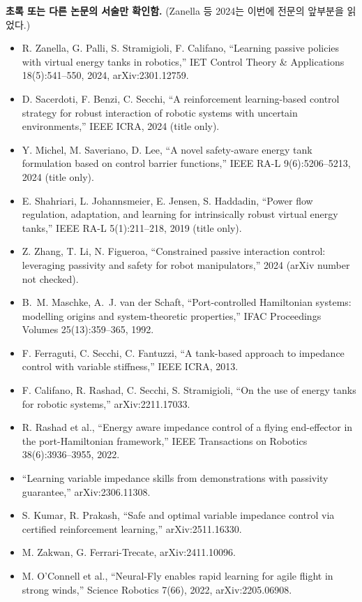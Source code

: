 \documentclass[11pt]{article}\usepackage[margin=1in]{geometry}\usepackage{amsmath,amssymb,amsthm,mathtools}\usepackage{graphicx}\graphicspath{{figures/}{../figures/}{figs/}{./}}\usepackage{enumitem}\usepackage{hyperref}\usepackage{cleveref}\usepackage{tikz}\usetikzlibrary{arrows.meta,positioning,calc,shapes.geometric}\usepackage{float}\usepackage{rotating}\usepackage[most]{tcolorbox}\usepackage{kotex}\usepackage{booktabs}\usepackage{longtable}\emergencystretch=1.6em\tolerance=2000 \crefname{assumption}{Assumption}{Assumptions}\Crefname{assumption}{Assumption}{Assumptions}\crefname{definition}{Definition}{Definitions}\Crefname{definition}{Definition}{Definitions}\crefname{proposition}{Proposition}{Propositions}\Crefname{proposition}{Proposition}{Propositions}\crefname{fact}{Fact}{Facts}\Crefname{fact}{Fact}{Facts} \newtheorem{assumption}{Assumption}\newtheorem{definition}{Definition}\newtheorem{lemma}{Lemma}\newtheorem{proposition}{Proposition}\newtheorem{theorem}{Theorem}\newtheorem{corollary}{Corollary}\newtheorem{fact}{Fact}\theoremstyle{remark}\newtheorem{remark}{Remark} \newcommand{\R}{\mathbb{R}}\newcommand{\xb}{\bar x}\newcommand{\Ab}{\bar A}\newcommand{\By}{\bar B_y}\newcommand{\U}{\mathcal U}\newcommand{\Z}{\mathcal Z}
\begin{document}
\textbf{초록 또는 다른 논문의 서술만 확인함.} (Zanella 등 2024는 이번에 전문의 앞부분을 읽었다.)
\begin{itemize}
\item R. Zanella, G. Palli, S. Stramigioli, F. Califano, ``Learning passive policies with virtual energy tanks in robotics,'' IET Control Theory \& Applications 18(5):541--550, 2024, arXiv:2301.12759.
\item D. Sacerdoti, F. Benzi, C. Secchi, ``A reinforcement learning-based control strategy for robust interaction of robotic systems with uncertain environments,'' IEEE ICRA, 2024 (title only).
\item Y. Michel, M. Saveriano, D. Lee, ``A novel safety-aware energy tank formulation based on control barrier functions,'' IEEE RA-L 9(6):5206--5213, 2024 (title only).
\item E. Shahriari, L. Johannsmeier, E. Jensen, S. Haddadin, ``Power flow regulation, adaptation, and learning for intrinsically robust virtual energy tanks,'' IEEE RA-L 5(1):211--218, 2019 (title only).
\item Z. Zhang, T. Li, N. Figueroa, ``Constrained passive interaction control: leveraging passivity and safety for robot manipulators,'' 2024 (arXiv number not checked).
\item B.~M. Maschke, A.~J. van der Schaft, ``Port-controlled Hamiltonian systems: modelling origins and system-theoretic properties,'' IFAC Proceedings Volumes 25(13):359--365, 1992.
\item F. Ferraguti, C. Secchi, C. Fantuzzi, ``A tank-based approach to impedance control with variable stiffness,'' IEEE ICRA, 2013.
\item F. Califano, R. Rashad, C. Secchi, S. Stramigioli, ``On the use of energy tanks for robotic systems,'' arXiv:2211.17033.
\item R. Rashad et al., ``Energy aware impedance control of a flying end-effector in the port-Hamiltonian framework,'' IEEE Transactions on Robotics 38(6):3936--3955, 2022.
\item ``Learning variable impedance skills from demonstrations with passivity guarantee,'' arXiv:2306.11308.
\item S. Kumar, R. Prakash, ``Safe and optimal variable impedance control via certified reinforcement learning,'' arXiv:2511.16330.
\item M. Zakwan, G. Ferrari-Trecate, arXiv:2411.10096.
\item M. O'Connell et al., ``Neural-Fly enables rapid learning for agile flight in strong winds,'' Science Robotics 7(66), 2022, arXiv:2205.06908.

\end{itemize}
\end{document}
